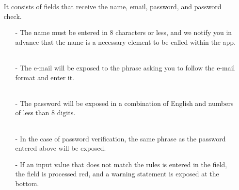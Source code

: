 \documentclass[conference]{IEEEtran}
\begin{document}
\begin{enumerate}
    \item[] It consists of fields that receive the name, email, password, and password check. \\
    \begin{itemize}
    \item[-] The name must be entered in 8 characters or less, and we notify you in advance that the name is a necessary element to be called within the app. \\ \\
    \item[-] The e-mail will be exposed to the phrase asking you to follow the e-mail format and enter it.
    \\ \\
    \item[-] The password will be exposed in a combination of English and numbers of less than 8 digits.
    \\ \\
    \item[-] In the case of password verification, the same phrase as the password entered above will be exposed.
    \\
    \item[-] If an input value that does not match the rules is entered in the field, the field is processed red, and a warning statement is exposed at the bottom.

\break
    

\end{itemize}
\end{enumerate}
\end{document}

